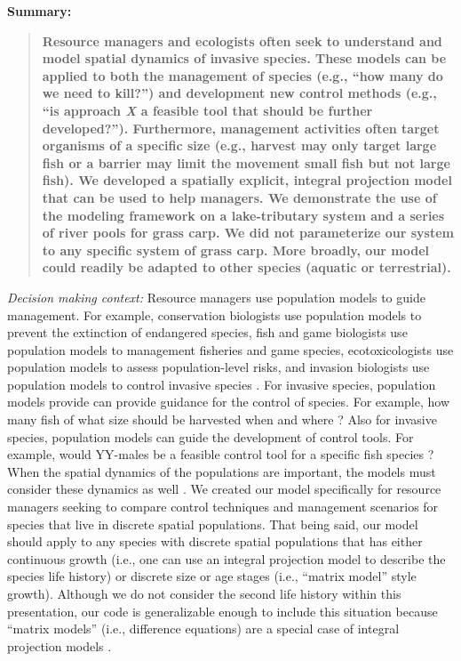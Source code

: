 \documentclass{article}[12pt]
\begin{document}
\textbf{Summary:}
\begin{verse}
\textbf{ 
Resource managers and ecologists often seek to understand and model spatial dynamics of invasive species.
These models can be applied to both the management of species (e.g., ``how many do we need to kill?'') and development new control methods (e.g., ``is approach \textit{X} a feasible tool that should be further developed?''). 
Furthermore, management activities often target organisms of a specific size (e.g., harvest may only target large fish or a barrier may limit the movement small fish but not large fish).
We developed a spatially explicit, integral projection model that can be used to help managers. 
We demonstrate the use of the modeling framework on a lake-tributary system and a series of river pools for grass carp.
We did not parameterize our system to any specific system of grass carp.
More broadly, our model could readily be adapted to other species (aquatic or terrestrial). 
}
\end{verse}

\textit{Decision making context:}
Resource managers use population models to guide management.
For example, conservation biologists use population models to prevent the extinction of endangered species, fish and game biologists use population models to management fisheries and game species, ecotoxicologists use population models to assess population-level risks, and  invasion biologists use population models to control invasive species \citep{morris2002quantitative}.
For invasive species, population models provide can provide guidance for the control of species.
For example, how many fish of what size should be harvested when and where \citep[e.g.,][]{tsehaye2013prospects}?
Also for invasive species, population models can guide the development of control tools.
For example, would YY-males be a feasible control tool for a specific fish species \citep[e.g.,][]{Erickson:2017ecomod, schill2017simulated}?
When the spatial dynamics of the populations are important, the models must consider these dynamics as well \citep{strasser2012contributions}. 
We created our model specifically for resource managers seeking to compare control techniques and management scenarios for species that live in discrete spatial populations. 
That being said, our model should apply to any species with discrete spatial populations that has either continuous growth (i.e., one can use an integral projection model to describe the species life history) or discrete size or age stages (i.e., ``matrix model'' style growth). 
Although we do not consider the second life history within this presentation, our code is generalizable enough to include this situation because ``matrix models'' (i.e., difference equations) are a special case of integral projection models \citep{Ellner:2010IPM}.
\end{document}

